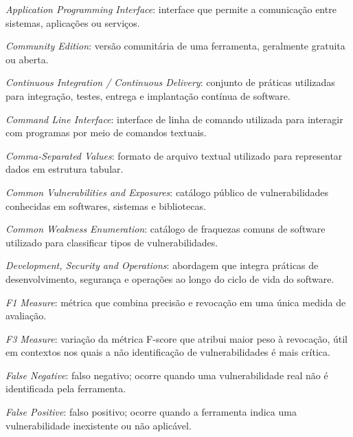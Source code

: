 \documentclass[
	12pt,					%
	openright,				%
	twoside,					%
	a4paper,					%
	english,					%
	brazil					%
	]{abntex2}
\begin{document}
\begin{siglas}
\item[API] \textit{Application Programming Interface}: interface que permite a comunicação entre sistemas, aplicações ou serviços.
  
  \item[CE] \textit{Community Edition}: versão comunitária de uma ferramenta, geralmente gratuita ou aberta.
  
  \item[CI/CD] \textit{Continuous Integration / Continuous Delivery}: conjunto de práticas utilizadas para integração, testes, entrega e implantação contínua de software.
  
  \item[CLI] \textit{Command Line Interface}: interface de linha de comando utilizada para interagir com programas por meio de comandos textuais.
  
  \item[CSV] \textit{Comma-Separated Values}: formato de arquivo textual utilizado para representar dados em estrutura tabular.
  
  \item[CVE] \textit{Common Vulnerabilities and Exposures}: catálogo público de vulnerabilidades conhecidas em softwares, sistemas e bibliotecas.
  
  \item[CWE] \textit{Common Weakness Enumeration}: catálogo de fraquezas comuns de software utilizado para classificar tipos de vulnerabilidades.
  
  \item[DevSecOps] \textit{Development, Security and Operations}: abordagem que integra práticas de desenvolvimento, segurança e operações ao longo do ciclo de vida do software.
  
  \item[F1-score] \textit{F1 Measure}: métrica que combina precisão e revocação em uma única medida de avaliação.
  
  \item[F3-score] \textit{F3 Measure}: variação da métrica F-score que atribui maior peso à revocação, útil em contextos nos quais a não identificação de vulnerabilidades é mais crítica.
  
  \item[FN] \textit{False Negative}: falso negativo; ocorre quando uma vulnerabilidade real não é identificada pela ferramenta.
  
  \item[FP] \textit{False Positive}: falso positivo; ocorre quando a ferramenta indica uma vulnerabilidade inexistente ou não aplicável.
  

\end{siglas}
\end{document}
